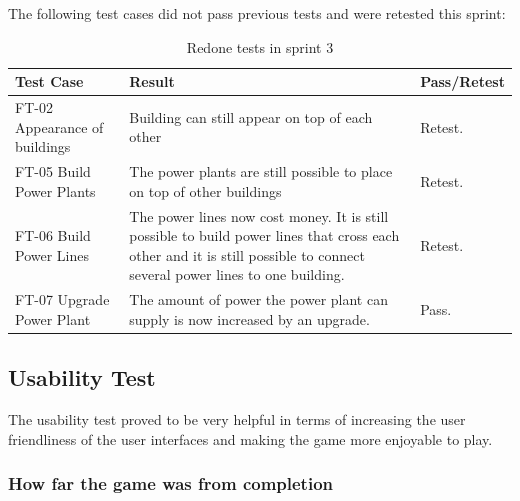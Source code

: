 	The following test cases did not pass previous tests and were retested this sprint:

	\begin{table}
	\begin{tabular}{| p{3cm} | p{6.5cm} | p{2.5cm} |}
		\hline
		\rowcolor{lightgray}
		{\bf Test Case} & {\bf Result} & {\bf Pass/Retest} \\ \hline

		FT-02 Appearance of buildings & Building can still appear on top of each other & Retest. \\ \hline

	  	FT-05 Build Power Plants & The power plants are still possible to place on top of other buildings & Retest. \\ \hline

	  	FT-06 Build Power Lines & The power lines now cost money. It is still possible to build power lines that cross each other and it is still possible to connect several power lines to one building. & Retest. \\ \hline

	  	FT-07 Upgrade Power Plant & The amount of power the power plant can supply is now increased by an upgrade. & Pass. \\ \hline
	\end{tabular}
	\caption{Redone tests in sprint 3}
	\end{table}

\subsection{Usability Test}

	The usability test proved to be very helpful in terms of increasing the user friendliness of the user interfaces and making the game more enjoyable to play.

	\subsubsection*{How far the game was from completion}

